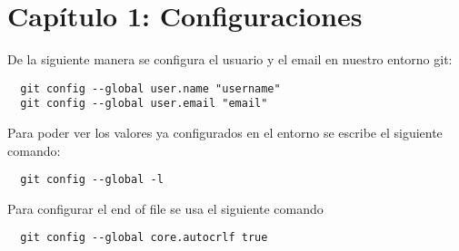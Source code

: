 \section{Capítulo 1: Configuraciones}
De la siguiente manera se configura el usuario y el email en nuestro entorno git:

\begin{lstlisting}
  git config --global user.name "username"
  git config --global user.email "email"
\end{lstlisting}

Para poder ver los valores ya configurados en el entorno se escribe el siguiente comando:

\begin{lstlisting}
  git config --global -l
\end{lstlisting}

Para configurar el end of file se usa el siguiente comando

\begin{lstlisting}
  git config --global core.autocrlf true
\end{lstlisting}
